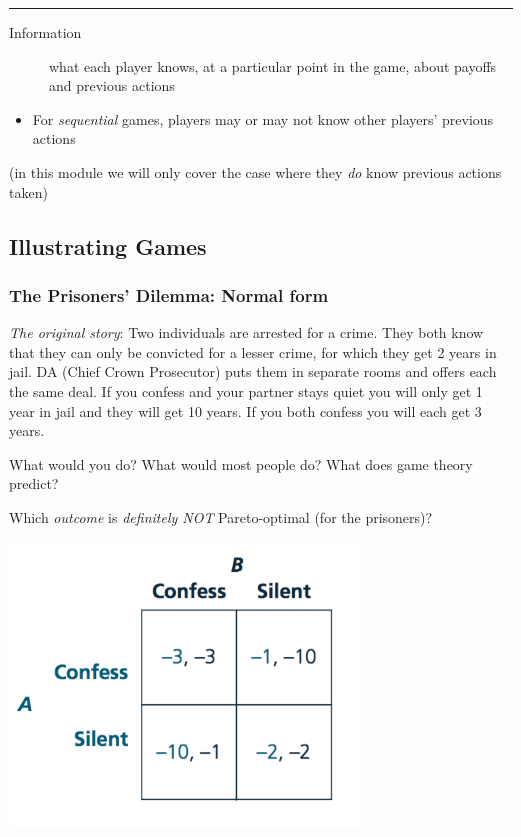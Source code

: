 \documentclass[]{article}
\providecommand{\tightlist}{%
  \setlength{\itemsep}{0pt}\setlength{\parskip}{0pt}}
\begin{document}
\begin{center}\rule{0.5\linewidth}{\linethickness}\end{center}

\begin{description}
\item[Information]
what each player knows, at a particular point in the game, about payoffs
and previous actions
\end{description}

\begin{itemize}
\tightlist
\item
  For \emph{sequential} games, players may or may not know other
  players' previous actions
\end{itemize}

(in this module we will only cover the case where they \emph{do} know
previous actions taken)

\hypertarget{illustrating-games}{%
\subsection{Illustrating Games}\label{illustrating-games}}

\hypertarget{the-prisoners-dilemma-normal-form}{%
\subsubsection{The Prisoners' Dilemma: Normal
form}\label{the-prisoners-dilemma-normal-form}}

\emph{The original story}: Two individuals are arrested for a crime.
They both know that they can only be convicted for a lesser crime, for
which they get 2 years in jail. DA (Chief Crown Prosecutor) puts them in
separate rooms and offers each the same deal. If you confess and your
partner stays quiet you will only get 1 year in jail and they will get
10 years. If you both confess you will each get 3 years.

What would you do? What would most people do? What does game theory
predict?

\bigskip

Which \emph{outcome} is \emph{definitely NOT} Pareto-optimal (for the
prisoners)?

\includegraphics[height=3in]{picsfigs/pd_normal.png}
\end{document}
